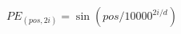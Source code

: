 \documentclass[preview]{standalone}
\begin{document}
\begin{align*}
PE_{(pos,2i)} = \sin\left( pos / 10000^{2i/d} \right)
\end{align*}
\end{document}

